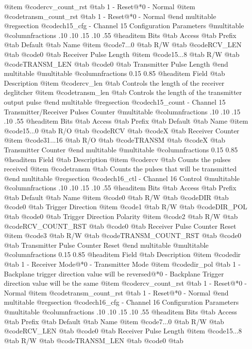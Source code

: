 @item @code{rcv_count_rst} @tab 1 - Reset@*0 - Normal
@item @code{transm_count_rst} @tab 1 - Reset@*0 - Normal
@end multitable
@regsection @code{ch15_cfg} - Channel 15 Configuration Parameters
@multitable @columnfractions .10 .10 .15 .10 .55
@headitem Bits @tab Access @tab Prefix @tab Default @tab Name
@item @code{7...0}
@tab R/W @tab
@code{RCV_LEN}
@tab @code{0} @tab 
Receiver Pulse Length
@item @code{15...8}
@tab R/W @tab
@code{TRANSM_LEN}
@tab @code{0} @tab 
Transmitter Pulse Length
@end multitable
@multitable @columnfractions 0.15 0.85
@headitem Field @tab Description
@item @code{rcv_len} @tab Controls the length of the receiver deglitcher
@item @code{transm_len} @tab Controls the length of the transmitter output pulse
@end multitable
@regsection @code{ch15_count} - Channel 15 Transmitter/Receiver Pulses Counter
@multitable @columnfractions .10 .10 .15 .10 .55
@headitem Bits @tab Access @tab Prefix @tab Default @tab Name
@item @code{15...0}
@tab R/O @tab
@code{RCV}
@tab @code{X} @tab 
Receiver Counter
@item @code{31...16}
@tab R/O @tab
@code{TRANSM}
@tab @code{X} @tab 
Transmitter Counter
@end multitable
@multitable @columnfractions 0.15 0.85
@headitem Field @tab Description
@item @code{rcv} @tab Counts the pulses received
@item @code{transm} @tab Counts the pulses that will be transmitted
@end multitable
@regsection @code{ch16_ctl} - Channel 16 Control
@multitable @columnfractions .10 .10 .15 .10 .55
@headitem Bits @tab Access @tab Prefix @tab Default @tab Name
@item @code{0}
@tab R/W @tab
@code{DIR}
@tab @code{0} @tab 
Trigger Direction
@item @code{1}
@tab R/W @tab
@code{DIR_POL}
@tab @code{0} @tab 
Trigger Direction Polarity
@item @code{2}
@tab R/W @tab
@code{RCV_COUNT_RST}
@tab @code{0} @tab 
Receiver Pulse Counter Reset
@item @code{3}
@tab R/W @tab
@code{TRANSM_COUNT_RST}
@tab @code{0} @tab 
Transmitter Pulse Counter Reset
@end multitable
@multitable @columnfractions 0.15 0.85
@headitem Field @tab Description
@item @code{dir} @tab 1 - Receiver Mode@*0 - Transmitter Mode
@item @code{dir_pol} @tab 1 - Backplane trigger direction value will be reversed@*0 - Backplane Trigger direction value will be the same
@item @code{rcv_count_rst} @tab 1 - Reset@*0 - Normal
@item @code{transm_count_rst} @tab 1 - Reset@*0 - Normal
@end multitable
@regsection @code{ch16_cfg} - Channel 16 Configuration Parameters
@multitable @columnfractions .10 .10 .15 .10 .55
@headitem Bits @tab Access @tab Prefix @tab Default @tab Name
@item @code{7...0}
@tab R/W @tab
@code{RCV_LEN}
@tab @code{0} @tab 
Receiver Pulse Length
@item @code{15...8}
@tab R/W @tab
@code{TRANSM_LEN}
@tab @code{0} @tab 
